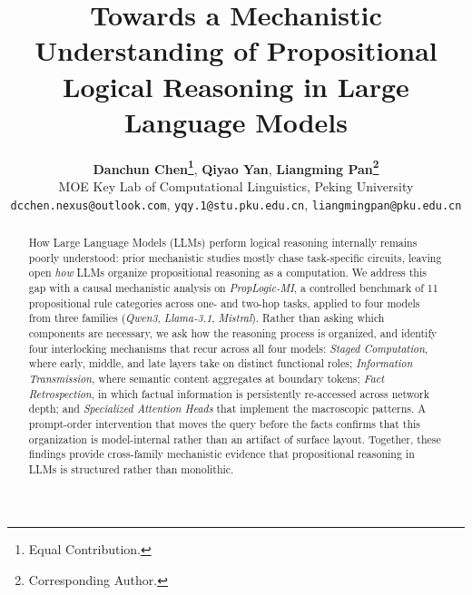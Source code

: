 \documentclass[11pt]{article}
\title{Towards a Mechanistic Understanding of Propositional \\ Logical Reasoning in Large Language Models}
\author{
  \textbf{Danchun Chen\thanks{Equal Contribution.}}, 
  \textbf{Qiyao Yan\footnotemark[1]},
  \textbf{Liangming Pan\thanks{Corresponding Author.}}
\\
  MOE Key Lab of Computational Linguistics, Peking University
\\
  \texttt{dcchen.nexus@outlook.com},
  \texttt{yqy.1@stu.pku.edu.cn},
  \texttt{liangmingpan@pku.edu.cn}
}
\begin{document}
\maketitle  
\begin{abstract}
How Large Language Models (LLMs) perform logical reasoning internally remains poorly understood: prior mechanistic studies mostly chase task-specific circuits, leaving open \emph{how} LLMs organize propositional reasoning as a computation. We address this gap with a causal mechanistic analysis on \textit{PropLogic-MI}, a controlled benchmark of 11 propositional rule categories across one- and two-hop tasks, applied to four models from three families (\textit{Qwen3}, \textit{Llama-3.1}, \textit{Mistral}). Rather than asking which components are necessary, we ask how the reasoning process is organized, and identify four interlocking mechanisms that recur across all four models: \textit{Staged Computation}, where early, middle, and late layers take on distinct functional roles; \textit{Information Transmission}, where semantic content aggregates at boundary tokens; \textit{Fact Retrospection}, in which factual information is persistently re-accessed across network depth; and \textit{Specialized Attention Heads} that implement the macroscopic patterns. A prompt-order intervention that moves the query before the facts confirms that this organization is model-internal rather than an artifact of surface layout. Together, these findings provide cross-family mechanistic evidence that propositional reasoning in LLMs is structured rather than monolithic.
\end{abstract}
\end{document}
